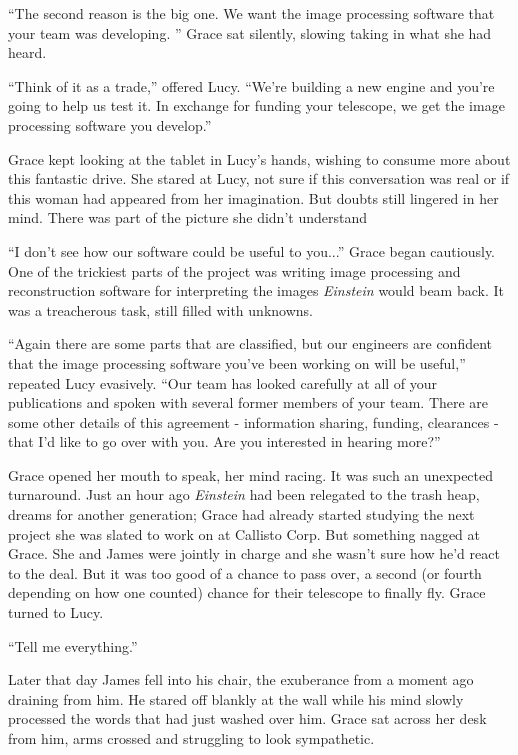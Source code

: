 \documentclass[12pt]{article} %
\begin{document}
 ``The second reason is the big one. We want the image processing software that your team was developing. '' Grace sat silently, slowing taking in what she had heard.

``Think of it as a trade,'' offered Lucy. ``We're building a new engine and you're going to help us test it. In exchange for funding your telescope, we get the image processing software you develop.''

Grace kept looking at the tablet in Lucy's hands, wishing to consume more about this fantastic drive. She stared at Lucy, not sure if this conversation was real or if this woman had appeared from her imagination. But doubts still lingered in her mind. There was part of the picture she didn't understand

``I don't see how our software could be useful to you...'' Grace began cautiously. One of the trickiest parts of the project was writing image processing and reconstruction software for interpreting the images \textit{Einstein} would beam back. It was a treacherous task, still filled with unknowns.

``Again there are some parts that are classified, but our engineers are confident that the image processing software you've been working on will be useful,'' repeated Lucy evasively. ``Our team has looked carefully at all of your publications and spoken with several former members of your team. There are some other details of this agreement - information sharing, funding, clearances - that I'd like to go over with you. Are you interested in hearing more?''

Grace opened her mouth to speak, her mind racing. It was such an unexpected turnaround. Just an hour ago \textit{Einstein} had been relegated to the trash heap, dreams for another generation; Grace had already started studying the next project she was slated to work on at Callisto Corp. But something nagged at Grace. She and James were jointly in charge and she wasn't sure how he'd react to the deal. But it was too good of a chance to pass over, a second (or fourth depending on how one counted) chance for their telescope to finally fly. Grace turned to Lucy.

``Tell me everything.''

Later that day James fell into his chair, the exuberance from a moment ago draining from him. He stared off blankly at the wall while his mind slowly processed the words that had just washed over him. Grace sat across her desk from him, arms crossed and struggling to look sympathetic.
\end{document}
